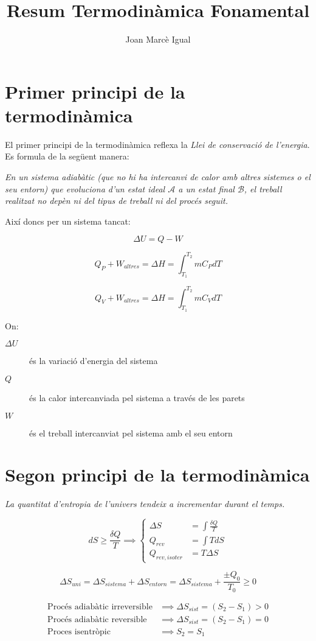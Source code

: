 \documentclass[a4paper]{article}
\title{Resum Termodinàmica Fonamental}
\author{Joan Marcè Igual}
\begin{document}
\maketitle

\section{Primer principi de la termodinàmica}

El primer principi de la termodinàmica reflexa la \emph{Llei de conservació de l'energia}. Es formula de la següent manera:

\begin{displayquote}
	\em
	En un sistema adiabàtic (que no hi ha intercanvi de calor amb altres sistemes o el seu entorn) que evoluciona d'un estat ideal $\mathcal{A}$ a un estat final $\mathcal{B}$, el treball realitzat no depèn ni del tipus de treball ni del procés seguit.
\end{displayquote}

Així doncs per un sistema tancat:

$$
\Delta U = Q - W
$$

$$
Q_P + W_{altres} = \Delta H = \int_{T_1}^{T_2} m C_P dT
$$

$$
Q_V + W_{altres} = \Delta H = \int_{T_1}^{T_2} m C_V dT
$$

On:
\begin{description}
	\item[\boldmath $\Delta U$] és la variació d'energia del sistema
	\item[\boldmath $Q$] és la calor intercanviada pel sistema a través de les parets
	\item[\boldmath $W$] és el treball intercanviat pel sistema amb el seu entorn
\end{description}

\section{Segon principi de la termodinàmica}

\begin{displayquote}
	\em
	La quantitat d'entropia de l'univers tendeix a incrementar durant el temps.
\end{displayquote}

$$
dS \ge \frac{\delta Q}{T} \implies
\begin{cases}
\Delta S &= \int \frac{\delta Q}{T} \\
Q_{rev} &= \int T dS \\
Q_{rev,isoter} &= T \Delta S
\end{cases}
$$

$$
\Delta S_{uni} = \Delta S_{sistema} + \Delta S_{entorn} = \Delta S_{sistema} + \frac{\pm Q_0}{T_0} \ge 0
$$

\begin{align*}
	\text{Procés adiabàtic irreversible} &\implies \Delta S_{sist} = (S_2 - S_1) > 0 \\
	\text{Procés adiabàtic reversible}  &\implies \Delta S_{sist} = (S_2 - S_1) = 0 \\
	\text{Proces isentròpic} &\implies S_2 = S_1
\end{align*}
\end{document}
